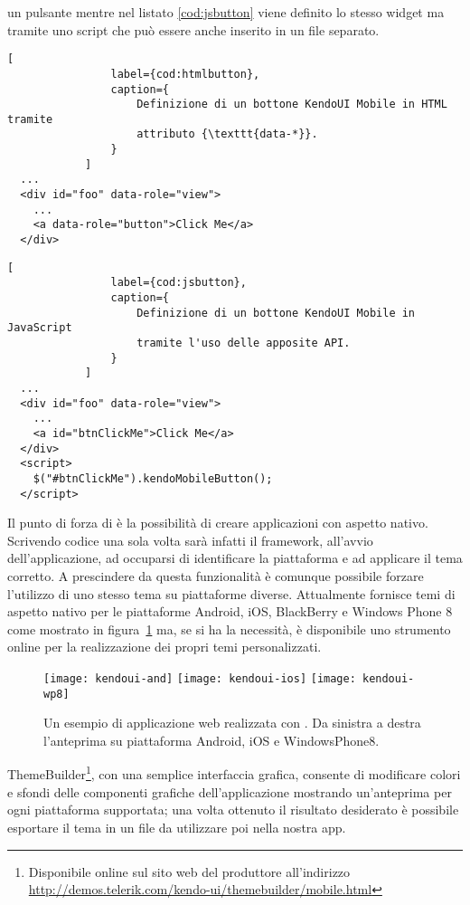             \html{} un pulsante \kendomob{} mentre nel listato \ref{cod:jsbutton}
            viene definito lo stesso widget ma tramite uno script \js{} che
            può essere anche inserito in un file separato.
            \begin{lstlisting}[
                label={cod:htmlbutton},
                caption={
                    Definizione di un bottone KendoUI Mobile in HTML tramite
                    attributo {\texttt{data-*}}.
                }
            ]
  ...
  <div id="foo" data-role="view">
    ...
    <a data-role="button">Click Me</a>
  </div>
            \end{lstlisting}
            \begin{lstlisting}[
                label={cod:jsbutton},
                caption={
                    Definizione di un bottone KendoUI Mobile in JavaScript
                    tramite l'uso delle apposite API.
                }
            ]
  ...
  <div id="foo" data-role="view">
    ...
    <a id="btnClickMe">Click Me</a>
  </div>
  <script>
    $("#btnClickMe").kendoMobileButton();
  </script>
            \end{lstlisting}

            Il punto di forza di \kendomob{} è la possibilità di creare
            applicazioni con aspetto nativo. Scrivendo codice una sola volta
            sarà infatti il frame\-work, all'avvio dell'applicazione, ad occuparsi
            di identificare la piattaforma e ad applicare il tema corretto. A
            prescindere da questa funzionalità è comunque possibile forzare
            l'utilizzo di uno stesso tema su piattaforme diverse. Attualmente
            \kendomob{} fornisce temi di aspetto nativo per le piattaforme
            Android, iOS, BlackBerry e Windows Phone 8 come mostrato in
            figura~\ref{fig:kendoui} ma, se si ha la necessità, è disponibile
            uno strumento online per la realizzazione dei propri temi
            personalizzati.
            \begin{figure}[h]
                \centering
                \texttt{[image: kendoui-and]}
                \texttt{[image: kendoui-ios]}
                \texttt{[image: kendoui-wp8]}
                \caption{
                    Un esempio di applicazione web realizzata con \kendomob{}.
                    Da sinistra a destra l'anteprima su piattaforma Android, iOS
                    e WindowsPhone8.
                }
                \label{fig:kendoui}
            \end{figure}
            ThemeBuilder\footnote{Disponibile online sul sito web del produttore
            all'indirizzo \url{http://demos.telerik.com/kendo-ui/themebuilder/mobile.html}},
            con una semplice interfaccia grafica, consente di modificare colori e
            sfondi delle componenti grafiche dell'applicazione mostrando
            un'anteprima per ogni piattaforma supportata; una volta ottenuto il
            risultato desiderato è possibile esportare il tema in un file \css{} da
            utilizzare poi nella nostra app.

